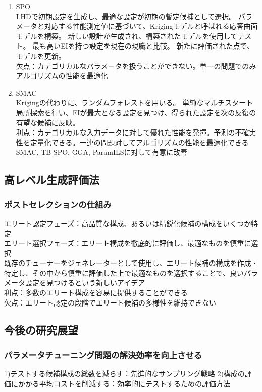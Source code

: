 \documentclass[twocolumn]{jarticle}     %
\begin{document}
\begin{enumerate}
  \item SPO \\
  LHDで初期設定を生成し、最適な設定が初期の暫定候補として選択。
  パラメータと対応する性能測定値に基づいて、Krigingモデルと呼ばれる応答曲面モデルを構築。
  新しい設計が生成され、構築されたモデルを使用してテスト。
  最も高いEIを持つ設定を現在の現職と比較。
  新たに評価された点で、モデルを更新。\\
  欠点：カテゴリカルなパラメータを扱うことができない。単一の問題でのみアルゴリズムの性能を最適化

  \item SMAC \\
  Krigingの代わりに、ランダムフォレストを用いる。
  単純なマルチスタート局所探索を行い、EIが最大となる設定を見つけ、得られた設定を次の反復の有望な候補に反映。\\
  利点：カテゴリカルな入力データに対して優れた性能を発揮。予測の不確実性を定量化できる。一連の問題対してアルゴリズムの性能を最適化できる\\
  SMAC, TB-SPO, GGA, ParamILSに対して有意に改善\\
\end{enumerate}

\subsection{高レベル生成評価法}
\subsubsection{ポストセレクションの仕組み}
エリート認定フェーズ：高品質な構成、あるいは精鋭化候補の構成をいくつか特定\\
エリート選択フェーズ：エリート構成を徹底的に評価し、最適なものを慎重に選択\\
既存のチューナーをジェネレーターとして使用し、エリート候補の構成を作成・特定し、その中から慎重に評価した上で最適なものを選択することで、良いパラメータ設定を見つけるという新しいアイデア\\
利点：多数のエリート構成を容易に提供することができる\\
欠点：エリート認定の段階でエリート候補の多様性を維持できない

\subsection{今後の研究展望}
\subsubsection{パラメータチューニング問題の解決効率を向上させる}
1)テストする候補構成の総数を減らす：先進的なサンプリング戦略
2)構成の評価にかかる平均コストを削減する：効率的にテストするための評価方法
\end{document}
